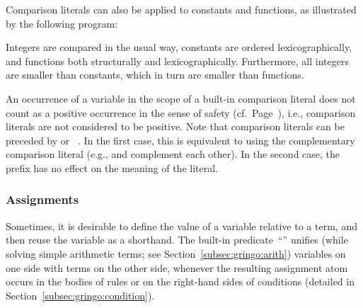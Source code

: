 \begin{example}\label{ex:symb:pred}
Comparison literals can also be applied to constants and functions,
as illustrated by the following program:%
%

%
Integers are compared in the usual way, constants are ordered lexicographically,
and functions both structurally and lexicographically.
Furthermore, all integers are smaller than constants,
which in turn are smaller than functions.
\eexample
\end{example}

\begin{note}
An occurrence of a variable in the scope of a built-in comparison literal
does not count as a positive occurrence in the sense of safety (cf.\ Page~\pageref{pg:safe}),
i.e.,
comparison literals are not considered to be positive.
Note that comparison literals can be preceded by  or ~.
In the first case, this is equivalent to using the complementary comparison literal
(e.g., \code{<} and \code{>=} complement each other).
In the second case, the prefix has no effect on the meaning of the literal.
%
\end{note}

\subsubsection{Assignments}\label{subsec:gringo:assign}

Sometimes, it is desirable to define the value of a variable relative to a term,
and then reuse the variable as a shorthand.
The built-in predicate~``\code{=}'' unifies
(while solving simple arithmetic terms; see Section~\ref{subsec:gringo:arith})
variables on one side with terms on the other side,
whenever the resulting assignment atom occurs
in the bodies of rules or on the right-hand sides of conditions
(detailed in Section~\ref{subsec:gringo:condition}).

